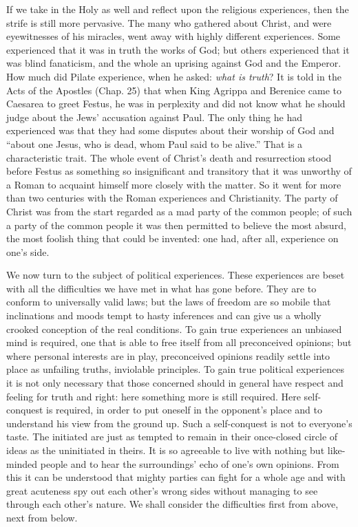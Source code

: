 \documentclass[12pt,a4paper,openany]{book}
\newcommand{\opage}[1]{\marginnote{\footnotesize\textit{[#1]}}}
\begin{document}
If we take in the Holy as well and reflect upon the religious
experiences, then the strife is still more pervasive.
The many who gathered about Christ, and
were eyewitnesses of his miracles, went away with highly
different experiences. Some experienced that it was in truth
the works of God; but others experienced that it
was blind fanaticism, and the whole an uprising against God
and the Emperor. How much did Pilate experience, when he
asked: \emph{what is truth}? It is told in the Acts of the Apostles
(Chap. 25) that when King Agrippa and
Berenice came to Caesarea to greet Festus,
he was in perplexity and did not know what he should
judge about the Jews' accusation against Paul. The only thing
he had experienced was that they had some disputes
about their worship of God and ``about one Jesus, who is dead,
whom Paul said to be alive.'' That is a characteristic
trait. The whole event of Christ's death and
resurrection stood before Festus as something so insignificant
and transitory that it was unworthy of a Roman to
\setcounter{footnote}{0}%
\opage{42}acquaint himself more closely with the matter. So it went for
more than two centuries with the Roman experiences
and Christianity. The party of Christ was from the start
regarded as a mad party of the common people; of such a
party of the common people it was then permitted to believe the most absurd, %
the most foolish thing that could be invented: one had, after all,
experience on one's side.

We now turn to the subject of political experiences.
These experiences are beset with all the
difficulties we have met in what has gone before. They
are to conform to universally valid laws; but the
laws of freedom are so mobile that inclinations and
moods tempt to hasty inferences and can give
us a wholly crooked conception of the real conditions.
To gain true experiences an unbiased mind is required,
one that is able to free itself from all preconceived opinions;
but where personal interests are in play,
preconceived opinions readily settle into place as
unfailing truths, inviolable principles.
To gain true political experiences it is not
only necessary that those concerned should in general
have respect and feeling for truth and right: here
something more is still required. Here self-conquest is required,
in order to put oneself in the opponent's place and to understand
his view from the ground up. Such a self-conquest
is not to everyone's taste. The initiated are just as
tempted to remain in their once-closed circle of ideas
as the uninitiated in theirs. It is so
agreeable to live with nothing but like-minded people and to hear
the surroundings' echo of one's own opinions. From this it can
be understood that mighty parties can fight for a whole
age and with great acuteness spy out
\setcounter{footnote}{0}%
\opage{43}each other's wrong sides without managing to see through
each other's nature. We shall consider the difficulties
first from above, next from below.
\end{document}
